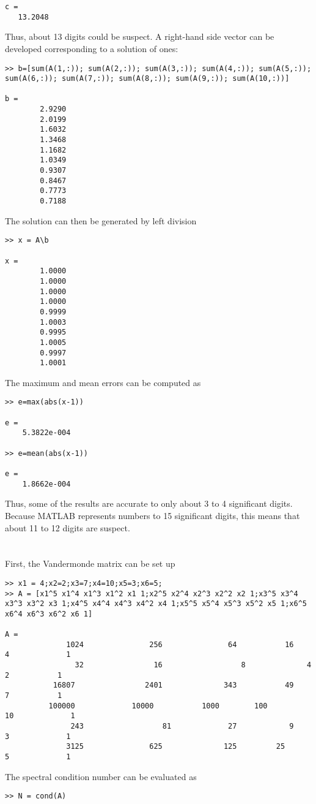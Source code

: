 \documentclass[../main.tex]{subfiles}
\begin{document}
\begin{enumerate}[label=\bfseries(\alph*)]
\begin{lstlisting}[numbers=none]
c =
   13.2048 
\end{lstlisting}
\bigbreak
Thus, about 13 digits could be suspect. A right-hand side vector can be developed
corresponding to a solution of ones:
\bigbreak
\begin{lstlisting}[numbers=none]
>> b=[sum(A(1,:)); sum(A(2,:)); sum(A(3,:)); sum(A(4,:)); sum(A(5,:));
sum(A(6,:)); sum(A(7,:)); sum(A(8,:)); sum(A(9,:)); sum(A(10,:))]

b =
 		2.9290
 		2.0199
 		1.6032
 		1.3468
 		1.1682
 		1.0349
 		0.9307
 		0.8467
 		0.7773
 		0.7188
\end{lstlisting}
\bigbreak
The solution can then be generated by left division
\bigbreak
\begin{lstlisting}[numbers=none]
>> x = A\b

x =
 		1.0000
		1.0000
 		1.0000
 		1.0000
 		0.9999
 		1.0003
		0.9995
		1.0005
 		0.9997
 		1.0001
\end{lstlisting}
\bigbreak
The maximum and mean errors can be computed as
\bigbreak
\begin{lstlisting}[numbers=none]
>> e=max(abs(x-1))

e =
 	5.3822e-004
 
>> e=mean(abs(x-1))

e =
 	1.8662e-004
\end{lstlisting}
\bigbreak
Thus, some of the results are accurate to only about 3 to 4 significant digits. Because\smallbreak
MATLAB represents numbers to 15 significant digits, this means that about 11 to 12 digits
\smallbreak are suspect.
\bigbreak


\section{}
First, the Vandermonde matrix can be set up
\bigbreak
\begin{lstlisting}[numbers=none]
>> x1 = 4;x2=2;x3=7;x4=10;x5=3;x6=5;
>> A = [x1^5 x1^4 x1^3 x1^2 x1 1;x2^5 x2^4 x2^3 x2^2 x2 1;x3^5 x3^4
x3^3 x3^2 x3 1;x4^5 x4^4 x4^3 x4^2 x4 1;x5^5 x5^4 x5^3 x5^2 x5 1;x6^5
x6^4 x6^3 x6^2 x6 1]

A =
 			  1024 				 256 			   64 			16 			  4 			1
			    32 				  16 				  8 			 4			  2			  1
 		   16807 				2401		 	  343 			49 				7 			1
 		  100000 			 10000 			 1000 		 100 			 10 			1
 			   243 					81 			   27 			 9 				3			  1
 			  3125 				 625 			  125 		  25			  5 			1
\end{lstlisting} 
\bigbreak
The spectral condition number can be evaluated as 
\bigbreak
\begin{lstlisting}[numbers=none]
>> N = cond(A)


\end{lstlisting}
\end{enumerate}
\end{document}
